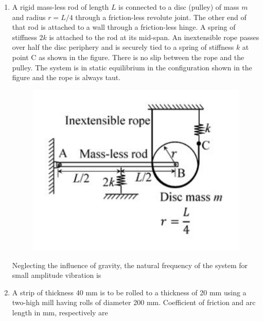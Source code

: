 \documentclass[12pt,onecolumn]{article}
\begin{document}
\begin{enumerate}
    \item A rigid mass-less rod of length $L$ is connected to a disc (pulley) of mass $m$ and radius $r=L/4$ through a friction-less revolute joint. The other end of that rod is attached to a wall through a friction-less hinge. A spring of stiffness $2k$ is attached to the rod at its mid-span. An inextensible rope passes over half the disc periphery and is securely tied to a spring of stiffness $k$ at point C as shown in the figure. There is no slip between the rope and the pulley. The system is in static equilibrium in the configuration shown in the figure and the rope is always taut.
          \begin{figure}[H]
              \centering
              \includegraphics[scale=0.5]{q31}
              \label{fig:q31}
          \end{figure}
          Neglecting the influence of gravity, the natural frequency of the system for small amplitude vibration is
          \begin{enumerate}
          \end{enumerate}

    \item A strip of thickness 40 mm is to be rolled to a thickness of 20 mm using a two-high mill having rolls of diameter 200 mm. Coefficient of friction and arc length in mm, respectively are
          \begin{enumerate}
          \end{enumerate}


\end{enumerate}
\end{document}
